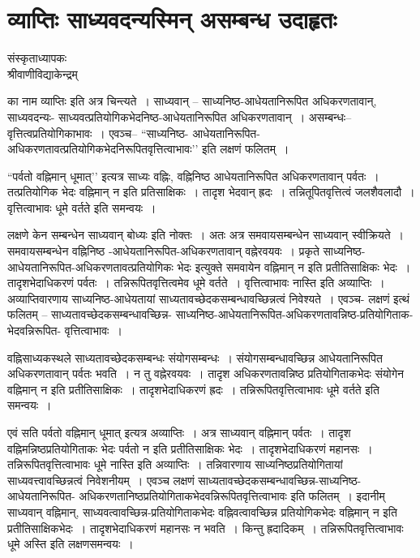 {\fontsize{15}{17}\selectfont
\presetvalues
\chapter{व्याप्तिः साध्यवदन्यस्मिन्  असम्बन्ध उदाहृतः}

\begin{center}
\smallskip

संस्कृताध्यापकः\\
श्रीवाणीविद्याकेन्द्रम्
\addrule
\end{center}

का नाम व्याप्तिः इति अत्र चिन्त्यते~। साध्यवान् – साध्यनिष्ठ-आधेयतानिरूपित अधिकरणतावान्, साध्यवदन्यः- साध्यवत्प्रतियोगिकभेदनिष्ठ-आधेयतानिरूपित अधिकरणतावान्~। असम्बन्धः--वृत्तित्वप्रतियोगिकाभावः~। एवञ्च– “साध्यनिष्ठ- आधेयतानिरूपित-अधिकरणतावत्प्रतियोगिकभेदनिरूपितवृत्तित्वाभावः’’ इति लक्षणं फलितम्~। 

“पर्वतो वह्निमान् धूमात्’’ इत्यत्र साध्यः वह्निः, वह्निनिष्ठ आधेयतानिरूपित अधिकरणतावान् पर्वतः~। तत्प्रतियोगिक भेदः वह्निमान् न इति प्रतिसाक्षिकः~। तादृश भेदवान् ह्रदः~। तन्नितूपितवृत्तित्वं जलशैवलादौ~। वृत्तित्वाभावः धूमे वर्तते इति समन्वयः~। 

लक्षणे केन सम्बन्धेन साध्यवान् बोध्यः इति नोक्तः~। अतः अत्र समवायसम्बन्धेन साध्यवान् स्वीक्रियते~। समवायसम्बन्धेन वह्निनिष्ठ -आधेयतानिरूपित-अधिकरणतावान् वह्नेरवयवः~। प्रकृते साध्यनिष्ठ-आधेयतानिरूपित-अधिकरणतावत्प्रतियोगिकः भेदः इत्युक्ते समवायेन वह्निमान् न इति प्रतीतिसाक्षिकः भेदः~। तादृशभेदाधिकरणं पर्वतः~। तन्निरूपितवृत्तित्वमेव धूमे वर्तते~। वृत्तित्वाभावः नास्ति इति अव्याप्तिः~। अव्याप्तिवारणाय साध्यनिष्ठ-आधेयतायां साध्यतावच्छेदकसम्बन्धावच्छिन्नत्वं निवेश्यते~। एवञ्च- लक्षणं इत्थं फलितम् – साध्यतावच्छेदकसम्बन्धावच्छिन्न- साध्यनिष्ठ-आधेयतानिरूपित-अधिकरणतावन्निष्ठ-प्रतियोगिताक-भेदवन्निरूपित- वृत्तित्वाभावः~। 

वह्निसाध्यकस्थले साध्यतावच्छेदकसम्बन्धः संयोगसम्बन्धः~। संयोगसम्बन्धावच्छिन्न आधेयतानिरूपित अधिकरणतावान् पर्वतः भवति~। न तु वह्नेरवयवः~। तादृश अधिकरणतावन्निष्ठ प्रतियोगिताकभेदः संयोगेन वह्निमान् न इति प्रतीतिसाक्षिकः~। तादृशभेदाधिकरणं ह्रदः~। तन्निरूपितवृत्तित्वाभावः धूमे वर्तते इति समन्वयः~। 

एवं सति पर्वतो वह्निमान् धूमात् इत्यत्र अव्याप्तिः~। अत्र साध्यवान् वह्निमान् पर्वतः~। तादृश वह्निमन्निष्ठप्रतियोगिताकः भेदः पर्वतो न इति प्रतीतिसाक्षिकः भेदः~। तादृशभेदाधिकरणं महानसः~। तन्निरूपितवृत्तित्वाभावः धूमे नास्ति इति अव्याप्तिः~। तन्निवारणाय साध्यनिष्ठप्रतियोगितायां साध्यवत्त्वावच्छिन्नत्वं निवेशनीयम्~। एवञ्च लक्षणं साध्यतावच्छेदकसम्बन्धा\-वच्छिन्न-साध्यनिष्ठ-आधेयतानिरूपित- अधिकरणतानिष्ठप्रतियोगिताकभेदवन्निरूपितवृत्तित्वाभावः इति फलितम्~। इदानीम् साध्यवान् वह्निमान्, साध्यवत्वावच्छिन्न-प्रतियोगिताकभेदः वह्निवत्वावच्छिन्न प्रतियोगिकभेदः वह्निमान् न इति प्रतीतिसाक्षिकभेदः~। तादृशभेदाधिकरणं महानसः न भवति~। किन्तु ह्रदादिकम्~। तन्निरूपितवृत्तित्वाभावः धूमे अस्ति इति लक्षणसमन्वयः~। 

\articleend
}
